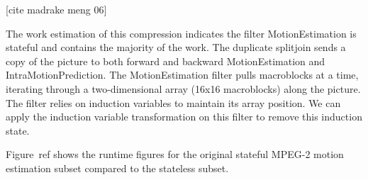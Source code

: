 [cite madrake meng 06]

The work estimation of this compression indicates the filter MotionEstimation is stateful and contains the majority of the work.  The duplicate splitjoin sends a copy of the picture to both forward and backward MotionEstimation and IntraMotionPrediction.  The MotionEstimation filter pulls macroblocks at a time, iterating through a two-dimensional array (16x16 macroblocks) along the picture.  The filter relies on induction variables to maintain its array position.  We can apply the induction variable transformation on this filter to remove this induction state.

Figure~ref{} shows the runtime figures for the original stateful MPEG-2 motion estimation subset compared to the stateless subset.  